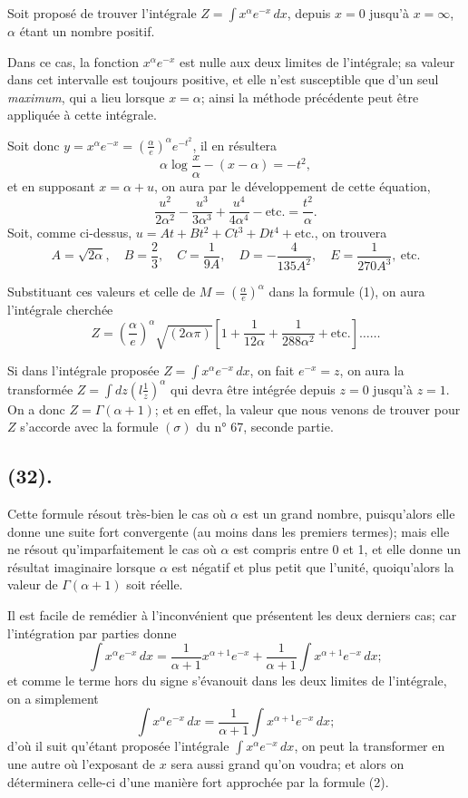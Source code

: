\documentclass{article}
\begin{document}
Soit proposé de trouver l'intégrale $Z=\displaystyle\int x^{\alpha}e^{-x}\,dx$, depuis $x=0$ jusqu'à $x=\infty$, $\alpha$ étant un nombre positif.

Dans ce cas, la fonction $x^{\alpha}e^{-x}$ est nulle aux deux limites de l'intégrale; sa valeur dans cet intervalle est toujours positive, et elle n'est susceptible que d'un seul \emph{maximum}, qui a lieu lorsque $x=\alpha$; ainsi la méthode précédente peut être appliquée à cette intégrale.

Soit donc $y=x^{\alpha}e^{-x}=\left(\frac{\alpha}{e}\right)^{\alpha}e^{-t^{2}}$, il en résultera
\[ \alpha\log\frac{x}{\alpha}-(x-\alpha)=-t^{2}, \]
et en supposant $x=\alpha+u$, on aura par le développement de cette équation,
\[ \frac{u^{2}}{2\alpha^{2}}-\frac{u^{3}}{3\alpha^{3}}+\frac{u^{4}}{4\alpha^{4}}-\text{etc.}=\frac{t^{2}}{\alpha}. \]
Soit, comme ci-dessus, $u=At+Bt^{2}+Ct^{3}+Dt^{4}+\text{etc.}$, on trouvera
\[ A=\sqrt{2\alpha},\quad B=\frac{2}{3},\quad C=\frac{1}{9A},\quad D=-\frac{4}{135A^{2}},\quad E=\frac{1}{270A^{3}},\ \text{etc.} \]

Substituant ces valeurs et celle de $M=\left(\frac{\alpha}{e}\right)^{\alpha}$ dans la formule (1), on aura l'intégrale cherchée
\[ Z=\left(\frac{\alpha}{e}\right)^{\alpha}\sqrt{(2\alpha\pi)}\left[1+\frac{1}{12\alpha}+\frac{1}{288\alpha^{2}}+\text{etc.}\right]\ldots\ldots \tag{2} \]

Si dans l'intégrale proposée $Z=\displaystyle\int x^{\alpha}e^{-x}\,dx$, on fait $e^{-x}=z$, on aura la transformée $Z=\displaystyle\int dz\left(l\frac{1}{z}\right)^{\alpha}$ qui devra être intégrée depuis $z=0$ jusqu'à $z=1$. On a donc $Z=\Gamma(\alpha+1)$; et en effet, la valeur que nous venons de trouver pour $Z$ s'accorde avec la formule $(\sigma)$ du n° 67, seconde partie.

\subsection*{(32).}

Cette formule résout très-bien le cas où $\alpha$ est un grand nombre, puisqu'alors elle donne une suite fort convergente (au moins dans les premiers termes); mais elle ne résout qu'imparfaitement le cas où $\alpha$ est compris entre 0 et 1, et elle donne un résultat imaginaire lorsque $\alpha$ est négatif et plus petit que l'unité, quoiqu'alors la valeur de $\Gamma(\alpha+1)$ soit réelle.

Il est facile de remédier à l'inconvénient que présentent les deux derniers cas; car l'intégration par parties donne
\[ \int x^{\alpha}e^{-x}\,dx=\frac{1}{\alpha+1}x^{\alpha+1}e^{-x}+\frac{1}{\alpha+1}\int x^{\alpha+1}e^{-x}\,dx; \]
et comme le terme hors du signe s'évanouit dans les deux limites de l'intégrale, on a simplement
\[ \int x^{\alpha}e^{-x}\,dx=\frac{1}{\alpha+1}\int x^{\alpha+1}e^{-x}\,dx; \]
d'où il suit qu'étant proposée l'intégrale $\displaystyle\int x^{\alpha}e^{-x}\,dx$, on peut la transformer en une autre où l'exposant de $x$ sera aussi grand qu'on voudra; et alors on déterminera celle-ci d'une manière fort approchée par la formule (2).
\end{document}
